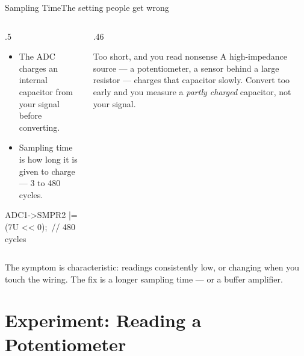 \documentclass[9pt,aspectratio=169,xcolor=table]{beamer}
\begin{document}
\begin{frame}{Sampling Time}{The setting people get wrong}
    \begin{columns}[T]
    \begin{column}{.5\textwidth}
        \begin{itemize}
            \item The ADC charges an internal capacitor from your signal
                  \alert{before} converting.
            \item \alert{Sampling time} is how long it is given to charge ---
                  3 to 480 cycles.
        \end{itemize}

        \vspace{2mm}
        {\ttfamily\scriptsize ADC1->SMPR2 |= (7U << 0);~// 480 cycles}
    \end{column}
    \begin{column}{.46\textwidth}
        \begin{block}{Too short, and you read nonsense}
            A \alert{high-impedance} source --- a potentiometer, a sensor behind a
            large resistor --- charges that capacitor slowly. Convert too early and
            you measure a \emph{partly charged} capacitor, not your signal.
        \end{block}
    \end{column}
    \end{columns}

    \vspace{3mm}
    {\small The symptom is characteristic: readings \alert{consistently low}, or
    changing when you touch the wiring. The fix is a longer sampling time --- or a
    buffer amplifier.}
\end{frame}


\section{Experiment: Reading a Potentiometer}
\end{document}
